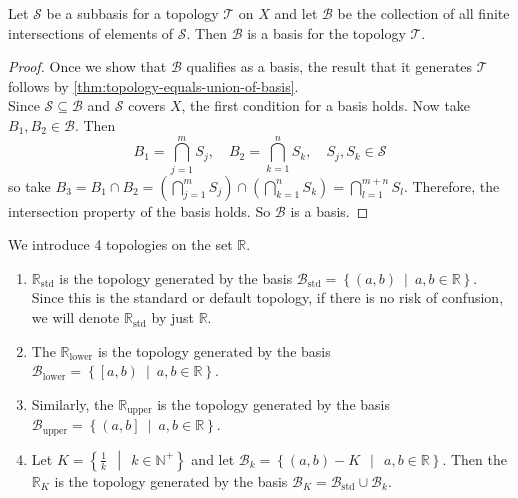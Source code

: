 \begin{lemma}
    Let \( \mathscr{S} \) be a subbasis for a topology \( \mathscr{T} \) on \( X \) and let \( \mathscr{B} \) be the collection of all finite intersections of elements of \( \mathscr{S} \). Then \( \mathscr{B} \) is a basis for the topology \( \mathscr{T} \).
\end{lemma}
\begin{proof}
    Once we show that \( \mathscr{B} \) qualifies as a basis, the result that it generates \( \mathscr{T} \) follows by \cref{thm:topology-equals-union-of-basis}. \\ 
    Since \( \mathscr{S} \subseteq \mathscr{B} \) and \( \mathscr{S} \) covers \( X \), the first condition for a basis holds. Now take \( B_{1}, B_{2} \in \mathscr{B} \). Then 
    \[ B_{1} = \bigcap_{j=1}^{m} S_{j}, \quad B_{2} = \bigcap_{k=1}^{n} S_{k}, \quad S_{j}, S_{k} \in \mathscr{S} \]
    so take 
    \( B_{3} = B_{1} \cap B_{2} = \left( \bigcap_{j=1}^{m} S_{j} \right) \cap \left( \bigcap_{k=1}^{n} S_{k} \right) = \bigcap_{l=1}^{m+n} S_{l}  .\)
    Therefore, the intersection property of the basis holds. So \( \mathscr{B} \) is a basis.
\end{proof}

\begin{example}
    We introduce 4 topologies on the set \( \mathbb{R} \). 
    \begin{enumerate}[label=\textbf{\roman*)}]
        \item \( \mathbb{R}_{\mathrm{std}} \) is the topology generated by the basis \( \mathscr{B}_{\mathrm{std}} = \left\{ \left( a,b \right) \ \middle| \ a,b \in \mathbb{R} \right\} \). Since this is the standard or default topology, if there is no risk of confusion, we will denote \( \mathbb{R}_{\mathrm{std}} \) by just \( \mathbb{R} \). 
        \item The  \( \mathbb{R}_{\mathrm{lower}} \) is the topology generated by the basis \( \mathscr{B}_{\mathrm{lower}}= \left\{ \left[ a,b \right) \ \middle| \ a,b \in \mathbb{R} \right\} \). 
        \item Similarly, the  \( \mathbb{R}_{\mathrm{upper}} \) is the topology generated by the basis \( \mathscr{B}_{\mathrm{upper}}= \left\{ \left( a,b \right] \ \middle| \ a,b \in \mathbb{R} \right\} \).
        \item Let \( K = \left\{ \frac{1}{k}\ \ \middle| \ \ k \in \mathbb{N}^{+} \right\} \) and let \( \mathscr{B}_{k} = \left\{ \left( a,b \right)- K \ \ \middle| \ \ a,b \in \mathbb{R} \right\} \). Then the  \( \mathbb{R}_{K} \) is the topology generated by the basis \( \mathscr{B}_{K} = \mathscr{B}_{\mathrm{std}} \cup \mathscr{B}_{k} \).
    \end{enumerate}
\end{example}


